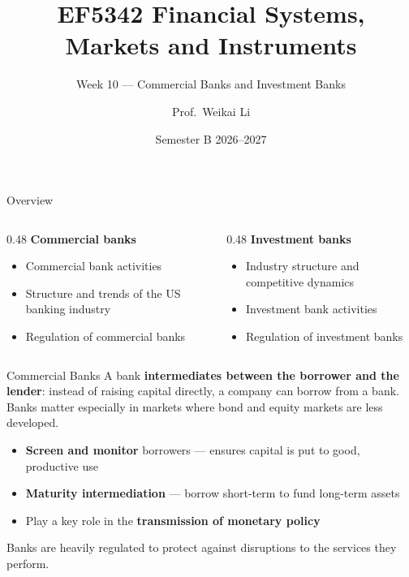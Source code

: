 \documentclass[aspectratio=169]{beamer}
\title{EF5342 Financial Systems, Markets and Instruments}
\subtitle{Week 10 --- Commercial Banks and Investment Banks}
\author{Prof.\ Weikai Li}
\institute{City University of Hong Kong}
\date{Semester B 2026--2027}
\begin{document}

\begin{frame}
\titlepage
\end{frame}

\begin{frame}{Overview}
\begin{columns}
\begin{column}{0.48\textwidth}
\textbf{Commercial banks}
\begin{itemize}
  \item Commercial bank activities
  \item Structure and trends of the US banking industry
  \item Regulation of commercial banks
\end{itemize}
\end{column}
\begin{column}{0.48\textwidth}
\textbf{Investment banks}
\begin{itemize}
  \item Industry structure and competitive dynamics
  \item Investment bank activities
  \item Regulation of investment banks
\end{itemize}
\end{column}
\end{columns}
\end{frame}

\begin{frame}{Commercial Banks}
A bank \textbf{intermediates between the borrower and the lender}: instead of raising capital directly, a company can borrow from a bank. Banks matter especially in markets where bond and equity markets are less developed.
\begin{itemize}
  \item \textbf{Screen and monitor} borrowers --- ensures capital is put to good, productive use
  \item \textbf{Maturity intermediation} --- borrow short-term to fund long-term assets
  \item Play a key role in the \textbf{transmission of monetary policy}
\end{itemize}
\vspace{0.3em}
Banks are heavily regulated to protect against disruptions to the services they perform.
\end{frame}
\end{document}
